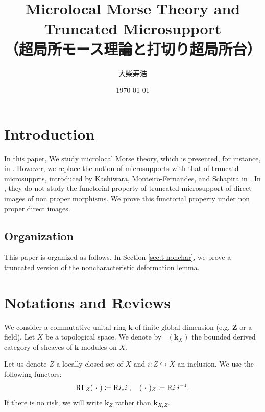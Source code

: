 ﻿\documentclass[a4paper,leqno]{jsarticle}
\title{
  Microlocal Morse Theory and Truncated Microsupport\\
  （超局所モース理論と打切り超局所台）
}
\author{大柴寿浩}
\date{
  \today
} %
\theoremstyle{definition}
\newcommand{\zz}{\mathbf{Z}}
\newcommand{\kk}{\mathbf{k}}
\numberwithin{equation}{section}
\newcommand{\Dompb}{\mathop{\mathsf{D}^\mathrm{b}}\nolimits}
\newcommand{\RG}{\mathop{\mathrm{R}\hspace{-0pt}\Gamma}\nolimits}
\newcommand{\Rder}[1][]{\mathop{\mathrm{R}^{#1}\hspace{-2pt}}\nolimits}
\newcommand{\blk}{\mathord{\ \cdot\ }}
\theoremstyle{mystyle}
\begin{document}
\maketitle

\tableofcontents
\section{Introduction}\label{sec:intro}

In this paper, 
We study microlocal Morse theory, which is presented, 
for instance, in \cite{GKS12}. 
However, we replace the notion of microsupports with
that of truncatd microsupprts, introduced by 
Kashiwara, Monteiro-Fernandes, and Schapira in \cite{KFS03}.
In \cite{KFS03}, they do not study the functorial property of 
truncated microsupport of direct images of non proper morphisms. 
We prove this functorial property under non proper direct images. 

\subsection{Organization}

This paper is organized as follows. 
In Section \ref{sec:t-nonchar}, 
we prove a truncated version of 
the noncharacteristic deformation lemma. 

\section{Notations and Reviews}\label{sec:review}

We consider a commutative unital ring \(\kk\) 
of finite global dimension (e.g. \(\zz\) or a field). 
Let \(X\) be a topological space. 
We denote by \(\Dompb(\kk_X)\) the bounded derived category of 
sheaves of \(\kk\)-modules on \(X\). 

Let us denote \(Z\) a locally closed set of \(X\) 
and \(i\colon Z\hookrightarrow X\) an inclusion. 
We use the following functors: 
\[
  \RG_{Z}(\blk) \coloneqq \Rder[]{i_{\ast}}i^{!}, 
  \quad
  (\blk)_{Z}\coloneqq \Rder[]{i_{!}}i^{-1}.
\]
If there is no risk, 
we will write \(\kk_Z\) rather than \(\kk_{X,Z}\).
\end{document}
